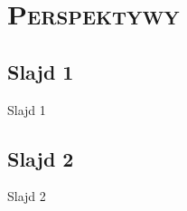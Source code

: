 \section{\scshape Perspektywy}

\subsection{Slajd 1}
\begin{frame}{Slajd 1}
\end{frame}

\subsection{Slajd 2}
\begin{frame}{Slajd 2}
\end{frame}